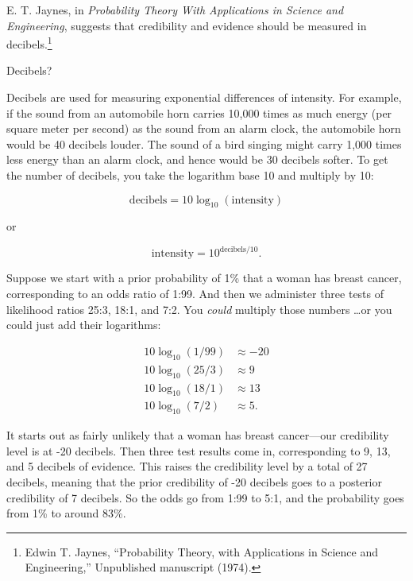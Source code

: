 \hr

{
 E. T. Jaynes, in \textit{Probability Theory With Applications in
Science and Engineering}, suggests that credibility and evidence should
be measured in decibels.\footnote{Edwin T. Jaynes, ``Probability Theory, with
Applications in Science and Engineering,''
Unpublished manuscript (1974).}}

{
 Decibels?}

{
 Decibels are used for measuring exponential differences of
intensity. For example, if the sound from an automobile horn carries
10,000 times as much energy (per square meter per second) as the sound
from an alarm clock, the automobile horn would be 40 decibels louder.
The sound of a bird singing might carry 1,000 times less energy than an
alarm clock, and hence would be 30 decibels softer. To get the number
of decibels, you take the logarithm base 10 and multiply by 10:}

\begin{equation*}
  \text{decibels} = 10\log_{10}(\text{intensity})
\end{equation*}

{
 or}

\begin{equation*}
  \text{intensity} = 10^{\text{decibels}/10}.
\end{equation*}

{
 Suppose we start with a prior probability of 1\% that a woman has
breast cancer, corresponding to an odds ratio of 1:99. And then we
administer three tests of likelihood ratios 25:3, 18:1, and 7:2. You
\textit{could} multiply those numbers \ldots or you could just add their
logarithms:}

\begin{align*}
 10\log_{10}(1/99) &\approx -20 \\
 10\log_{10}(25/3) &\approx 9 \\
 10\log_{10}(18/1) &\approx 13 \\
 10\log_{10}(7/2) &\approx 5.
\end{align*}

{
 It starts out as fairly unlikely that a woman has breast
cancer---our credibility level is at -20 decibels. Then three test
results come in, corresponding to 9, 13, and 5 decibels of evidence.
This raises the credibility level by a total of 27 decibels, meaning
that the prior credibility of -20 decibels goes to a posterior
credibility of 7 decibels. So the odds go from 1:99 to 5:1, and the
probability goes from 1\% to around 83\%.}

